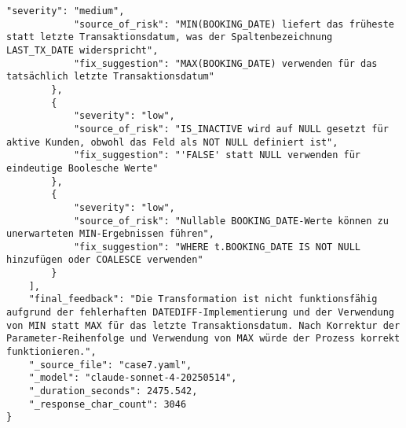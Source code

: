 \begin{lstlisting}[caption={Ausgabe: Claude Sonnet 4 Anwendungsfall 7 Robustheitsdurchlauf},label={claude_case7_prompt3}]
            "severity": "medium",
            "source_of_risk": "MIN(BOOKING_DATE) liefert das früheste statt letzte Transaktionsdatum, was der Spaltenbezeichnung LAST_TX_DATE widerspricht",
            "fix_suggestion": "MAX(BOOKING_DATE) verwenden für das tatsächlich letzte Transaktionsdatum"
        },
        {
            "severity": "low",
            "source_of_risk": "IS_INACTIVE wird auf NULL gesetzt für aktive Kunden, obwohl das Feld als NOT NULL definiert ist",
            "fix_suggestion": "'FALSE' statt NULL verwenden für eindeutige Boolesche Werte"
        },
        {
            "severity": "low",
            "source_of_risk": "Nullable BOOKING_DATE-Werte können zu unerwarteten MIN-Ergebnissen führen",
            "fix_suggestion": "WHERE t.BOOKING_DATE IS NOT NULL hinzufügen oder COALESCE verwenden"
        }
    ],
    "final_feedback": "Die Transformation ist nicht funktionsfähig aufgrund der fehlerhaften DATEDIFF-Implementierung und der Verwendung von MIN statt MAX für das letzte Transaktionsdatum. Nach Korrektur der Parameter-Reihenfolge und Verwendung von MAX würde der Prozess korrekt funktionieren.",
    "_source_file": "case7.yaml",
    "_model": "claude-sonnet-4-20250514",
    "_duration_seconds": 2475.542,
    "_response_char_count": 3046
}
\end{lstlisting}

